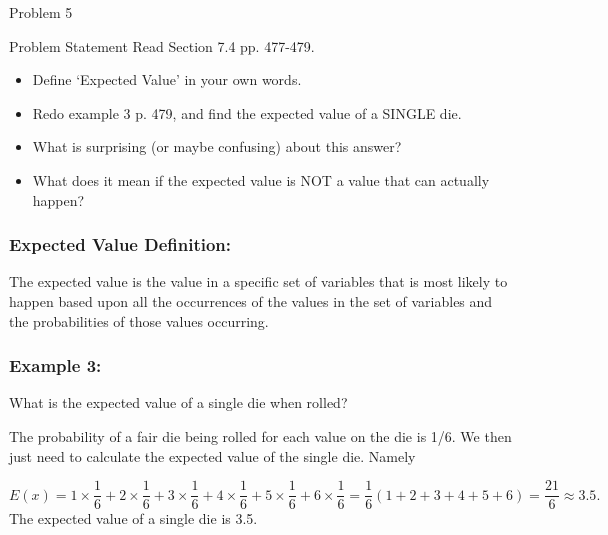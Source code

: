 \begin{problem}{Problem 5}
    \begin{statement}{Problem Statement}
        Read Section 7.4 pp. 477-479.

        \begin{itemize}
            \item Define `Expected Value' in your own words.
            \item Redo example 3 p. 479, and find the expected value of a SINGLE die.
            \item What is surprising (or maybe confusing) about this answer?
            \item What does it mean if the expected value is NOT a value that can actually happen?
        \end{itemize}
    \end{statement}

    \begin{Highlight}[Solution]
        \subsubsection*{Expected Value Definition:}

        The expected value is the value in a specific set of variables that is most likely to happen based upon all the occurrences of the values in the set of variables and the probabilities of those
        values occurring. \vspace*{1em}

        \subsubsection*{Example 3:}

        \noindent What is the expected value of a single die when rolled? \vspace*{1em}

        The probability of a fair die being rolled for each value on the die is 1/6. We then just need to calculate the expected value of the single die. Namely

        \setcounter{equation}{0}
        \begin{equation}
            E(x) = 1 \times \frac{1}{6} + 2 \times \frac{1}{6} + 3 \times \frac{1}{6} + 4 \times \frac{1}{6} + 5 \times \frac{1}{6} + 6 \times \frac{1}{6} = \frac{1}{6} (1 + 2 + 3 + 4 + 5 + 6) = \frac{21}{6} \approx 3.5.
        \end{equation}
        The expected value of a single die is 3.5. \vspace*{1em}


\end{Highlight}
\end{problem}
